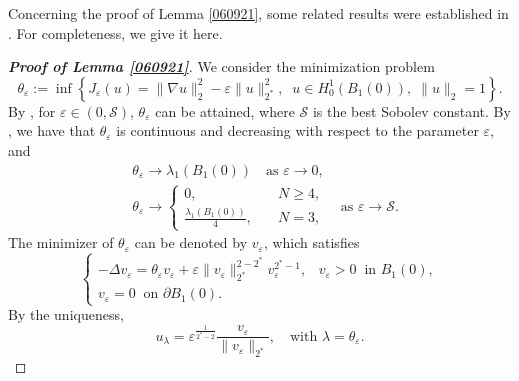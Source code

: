 \documentclass[10pt]{article}
\numberwithin{equation}{section}
\numberwithin{equation}{section}
\begin{document}
Concerning the proof of Lemma \ref{060921}, some related results were established in \cite{Rey1990, Zhang92}. For completeness, we give it here.


\begin{proof}[\bf Proof of Lemma \ref{060921}]
We consider the minimization problem
\[
\theta_\varepsilon:=\inf\left\{J_{\varepsilon}(u)=\|\nabla u\|_2^2-\varepsilon \|u\|_{2^*}^2,\;\; u\in H_0^1(B_1(0)),\;\|u\|_2=1\right\}.
\]
By \cite[Lemma 4.1]{Zhang92},  for $\varepsilon\in (0, \mathcal{S})$, $\theta_{\varepsilon}$ can be attained, where $\mathcal{S}$ is the best Sobolev constant. By \cite[Lemma 4.2]{Zhang92}, we have that $\theta_\varepsilon$ is continuous and decreasing with respect to the parameter $\varepsilon$, and
\[
\begin{aligned}
&\theta_{\varepsilon}\to \lambda_1(B_1(0))\quad \mbox{as } \varepsilon\to 0,\\
&\theta_{\varepsilon}\to
\begin{cases}
0,\quad &N\ge 4,\\
\frac{\lambda_1(B_1(0))}{4},\quad &N=3,
\end{cases}
\quad \mbox{as }\varepsilon\to \mathcal{S}.
\end{aligned}
\]
The minimizer of $\theta_\varepsilon$ can be denoted by $v_\varepsilon$, which satisfies
\begin{equation}\label{2410050043}
\begin{cases}
-\Delta v_\varepsilon= \theta_\varepsilon v_\varepsilon+\varepsilon \|v_\varepsilon\|_{2^*}^{2-2^*}v_\varepsilon^{2^*-1},\;\;\; v_\varepsilon>0\;\; \mbox{in } B_1(0),\\
v_\varepsilon=0\;\; \mbox{on } \partial B_1(0).
\end{cases}
\end{equation}
By the uniqueness,
\begin{equation}\label{2410050047}
u_\lambda=\varepsilon^{\frac{1}{2^*-2}}\frac{v_\varepsilon}{\|v_\varepsilon\|_{2^*}},\quad \mbox{with }\lambda=\theta_\varepsilon.
\end{equation}


\end{proof}
\end{document}
